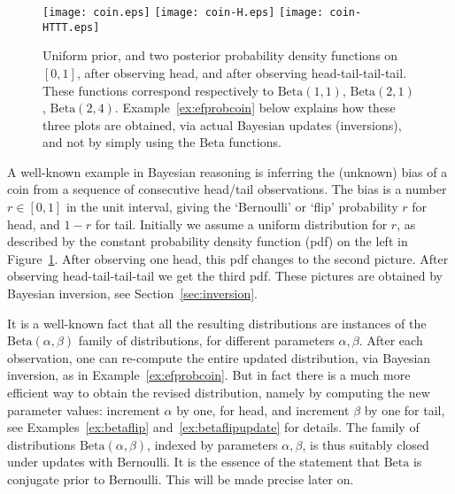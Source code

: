 \documentclass{mscs}
\newcommand{\betachan}{\ensuremath{\mathrm{Beta}}}
\begin{document}
\begin{figure}
\begin{center}
\texttt{[image: coin.eps]}
\texttt{[image: coin-H.eps]}
\texttt{[image: coin-HTTT.eps]}
\end{center}
\caption{Uniform prior, and two posterior probability density
  functions on $[0,1]$, after observing head, and after observing
  head-tail-tail-tail. These functions correspond respectively to
  $\betachan(1,1)$, $\betachan(2,1)$,
  $\betachan(2,4)$. Example~\ref{ex:efprobcoin} below explains how
  these three plots are obtained, via actual Bayesian updates
  (inversions), and not by simply using the $\betachan$ functions.}
\label{fig:coin}
\end{figure}

A well-known example in Bayesian reasoning is inferring the (unknown)
bias of a coin from a sequence of consecutive head/tail observations.
The bias is a number $r \in [0,1]$ in the unit interval, giving the
`Bernoulli' or `flip' probability $r$ for head, and $1-r$ for
tail. Initially we assume a uniform distribution for $r$, as described
by the constant probability density function (pdf) on the left in
Figure~\ref{fig:coin}.  After observing one head, this pdf changes to
the second picture. After observing head-tail-tail-tail we get the
third pdf. These pictures are obtained by Bayesian inversion, see
Section~\ref{sec:inversion}.

It is a well-known fact that all the resulting distributions are
instances of the $\betachan(\alpha,\beta)$ family of distributions,
for different parameters $\alpha,\beta$. After each observation, one
can re-compute the entire updated distribution, via Bayesian
inversion, as in Example~\ref{ex:efprobcoin}. But in fact there is a
much more efficient way to obtain the revised distribution, namely by
computing the new parameter values: increment $\alpha$ by one, for
head, and increment $\beta$ by one for tail, see
Examples~\ref{ex:betaflip} and~\ref{ex:betaflipupdate} for
details. The family of distributions $\betachan(\alpha,\beta)$,
indexed by parameters $\alpha,\beta$, is thus suitably closed under
updates with Bernoulli. It is the essence of the statement that
$\betachan$ is conjugate prior to Bernoulli. This will be made precise
later on.
\end{document}
